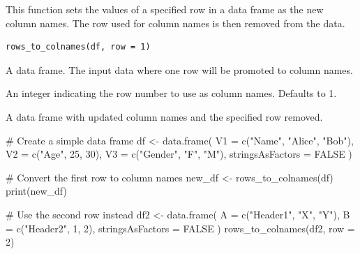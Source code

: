\documentclass[a4paper]{book}
\begin{document}
%
\begin{Description}
This function sets the values of a specified row in a data frame as the new column names.
The row used for column names is then removed from the data.
\end{Description}
%
\begin{Usage}
\begin{verbatim}
rows_to_colnames(df, row = 1)
\end{verbatim}
\end{Usage}
%
\begin{Arguments}
\begin{ldescription}
\item[\code{df}] A data frame. The input data where one row will be promoted to column names.

\item[\code{row}] An integer indicating the row number to use as column names. Defaults to 1.
\end{ldescription}
\end{Arguments}
%
\begin{Value}
A data frame with updated column names and the specified row removed.
\end{Value}
%
\begin{Examples}
\begin{ExampleCode}
# Create a simple data frame
df <- data.frame(
  V1 = c("Name", "Alice", "Bob"),
  V2 = c("Age", 25, 30),
  V3 = c("Gender", "F", "M"),
  stringsAsFactors = FALSE
)

# Convert the first row to column names
new_df <- rows_to_colnames(df)
print(new_df)

# Use the second row instead
df2 <- data.frame(
  A = c("Header1", "X", "Y"),
  B = c("Header2", 1, 2),
  stringsAsFactors = FALSE
)
rows_to_colnames(df2, row = 2)
\end{ExampleCode}
\end{Examples}
\end{document}

